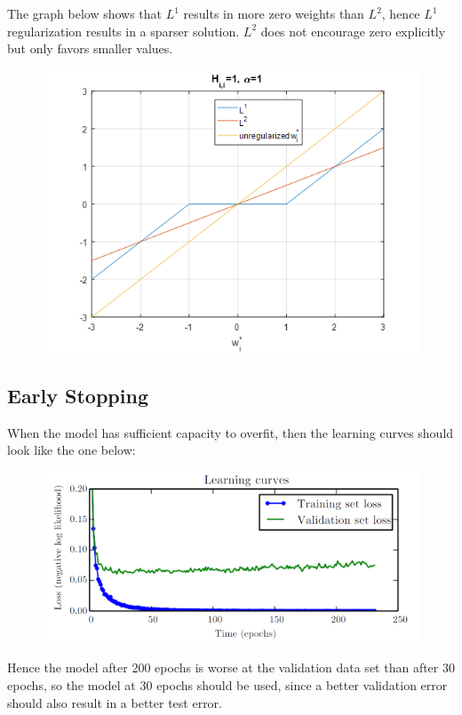 \begin{multicols}{2}
	The graph below shows that $L^1$ results in more zero weights than $L^2$, hence $L^1$ regularization results in a sparser solution. $L^2$ does not encourage zero explicitly but only favors smaller values.
	\begin{figure}[H]
		\centering
		\includegraphics[width=0.9\linewidth]{images/L1L2.png}
	\end{figure}
	
	\subsection{Early Stopping}
	When the model has sufficient capacity to overfit, then the learning curves should look like the one below:
	\begin{figure}[H]
		\centering
		\includegraphics[width=0.9\linewidth]{images/earlystopping.png}
	\end{figure}
	Hence the model after 200 epochs is worse at the validation data set than after 30 epochs, so the model at 30 epochs should be used, since a better validation error should also result in a better test error.\\
	

\end{multicols}
